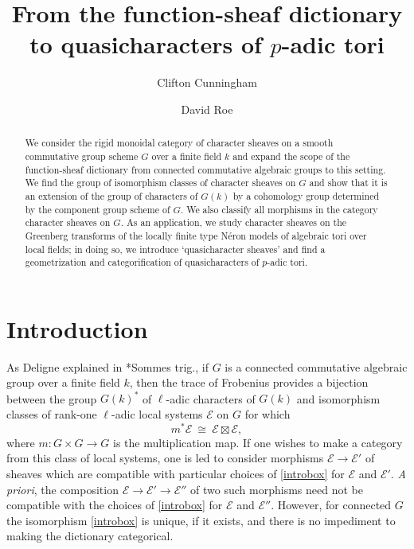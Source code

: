 \documentclass[10pt]{amsart}
\title{From the function-sheaf dictionary to quasicharacters of $p$-adic tori}
\author{Clifton Cunningham}
\author{David Roe}
\theoremstyle{plain}
\theoremstyle{definition}
\newcommand{\Fq}{k}
\newcommand{\iso}{{\ \cong\ }}
\newcommand{\cs}[1]{{\mathcal{#1}}}
\begin{document}
\begin{abstract}
We consider the rigid monoidal category of character sheaves on a smooth commutative group scheme $G$ over a finite field $k$ and expand the scope of the function-sheaf dictionary from connected commutative algebraic groups to this setting.
We find the group of isomorphism classes of character sheaves on $G$ and show that it is an extension of the group of characters of $G(k)$ by a cohomology group determined by the component group scheme of $G$.
We also classify all morphisms in the category character sheaves on $G$.
As an application, we study character sheaves on the Greenberg transforms of the locally finite type N\'eron models of algebraic tori over local fields; in doing so, we introduce `quasicharacter sheaves' and find a geometrization and categorification of quasi\-characters of $p$-adic tori.
\end{abstract}

\maketitle

\section*{Introduction}


As Deligne explained in \cite{deligne:SGA4.5}*{Sommes trig.}, if $G$ is a connected commutative algebraic group over a finite field $k$, then the trace of Frobenius provides a bijection between the group $G(\Fq)^*$ of $\ell$-adic characters of $G(\Fq)$ and isomorphism classes of rank-one $\ell$-adic local systems $\mathcal{E}$ on $G$ for which 
\begin{equation}\label{introbox}
m^* \cs{E} \iso \cs{E} \boxtimes \cs{E},
\end{equation}
where $m : G\times G\to G$ is the multiplication map.
%
If one wishes to make a category from this class of local systems, one is led to consider morphisms $\cs{E} \to \cs{E}'$ of sheaves which are compatible with particular choices of \eqref{introbox} for $\cs{E}$ and $\cs{E'}$. 
{\it A priori}, the composition $\cs{E} \to \cs{E}' \to \cs{E}''$ of two such morphisms need not be compatible with the choices of \eqref{introbox} for $\cs{E}$ and $\cs{E}''$.
 However, for connected $G$ the isomorphism \eqref{introbox} is unique, if it exists, and there is no impediment to making the dictionary categorical.
\end{document}
